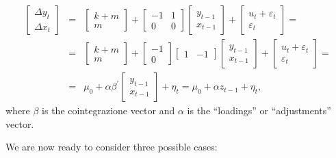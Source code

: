 \begin{eqnarray*}
  \left[  \begin{array}{c} \Delta y_t \\ \Delta x_t \end{array} \right]  & = & 
  \left[  \begin{array}{c} k + m \\ m \end{array} \right] +
  \left[  \begin{array}{rr} -1 & 1 \\ 0 & 0 \end{array} \right] 
  \left[  \begin{array}{c} y_{t-1} \\ x_{t-1} \end{array} \right] + 
  \left[  \begin{array}{c} u_t + \varepsilon_t \\ \varepsilon_t \end{array} \right] = \\
  & = & 
  \left[  \begin{array}{c} k + m \\ m \end{array} \right] +
  \left[  \begin{array}{r} -1 \\ 0 \end{array} \right]
  \left[  \begin{array}{rr} 1 & -1 \end{array} \right] 
  \left[  \begin{array}{c} y_{t-1} \\ x_{t-1} \end{array} \right] + 
  \left[  \begin{array}{c} u_t + \varepsilon_t \\ \varepsilon_t \end{array} \right] = \\
  & = & 
  \mu_0 + \alpha \beta^{\prime} \left[  \begin{array}{c} y_{t-1} \\ x_{t-1} \end{array} \right] + \eta_t = 
  \mu_0 + \alpha z_{t-1} + \eta_t ,
\end{eqnarray*}
%	
where $\beta$ is the cointegrazione vector and $\alpha$ is the
``loadings'' or ``adjustments'' vector.
     
We are now ready to consider three possible cases:
    
